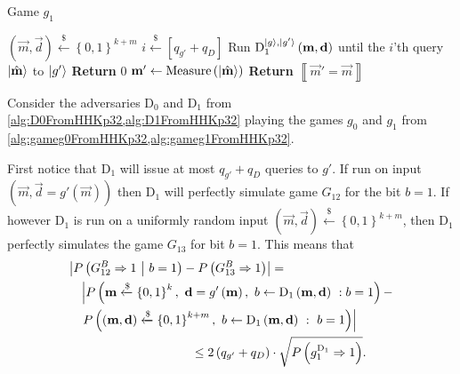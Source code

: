 \begin{center}
\begin{minipage}[ht!]{0.7\textwidth}
	\begin{algorithm}[H]
		\centering
		\caption{Game $g_1$}
		\label{alg:gameg1FromHHKp32}
		\begin{algorithmic}
			\State $\left(\vec{m}, \vec{d}\right) \xleftarrow{\$} \left\{ 0,1 \right\}^{k + m}$
			\State $i \xleftarrow{\$} \left[ q_{g'} + q_D \right]$
			\State Run $\mathrm{D}_1^{\lvert g\rangle, \lvert g'\rangle}\left(\boldsymbol{\mathrm{m}}, \boldsymbol{\mathrm{d}}\right)$ until the $i$'th query $\lvert\hat{\boldsymbol{\mathrm{m}}}\rangle$ to $\lvert g'\rangle$
				\State \textbf{Return} $0$
			\Else
				\State $\boldsymbol{\mathrm{m}}' \leftarrow \mathrm{Measure}\left( \lvert\hat{\boldsymbol{\mathrm{m}}}\rangle \right)$
				\State \textbf{Return} $\left\llbracket \vec{m}' = \vec{m} \right\rrbracket$
			\EndIf
		\end{algorithmic}
	\end{algorithm}
\end{minipage}
\end{center}

Consider the adversaries $\mathrm{D}_0$ and $\mathrm{D}_1$ from \cref{alg:D0FromHHKp32,alg:D1FromHHKp32} playing the games $g_0$ and $g_1$ from \cref{alg:gameg0FromHHKp32,alg:gameg1FromHHKp32}.

First notice that $\mathrm{D}_1$ will issue at most $q_{g'} + q_D$ queries to $g'$. If run on input $\left(\vec{m}, \vec{d} = g'\left(\vec{m}\right)\right)$ then $\mathrm{D}_1$ will perfectly simulate game $G_{12}$ for the bit $b = 1$. If however $\mathrm{D}_1$ is run on a uniformly random input $\left(\vec{m}, \vec{d}\right) \xleftarrow{\$} \left\{ 0,1 \right\}^{k + m}$, then $\mathrm{D}_1$ perfectly simulates the game $G_{13}$ for bit $b = 1$. This means that
\begin{equation*}
\begin{aligned}
	&\left\vert P\left( G_{12}^B \Rightarrow 1 \ \middle\vert \ b = 1 \right) - P\left( G_{13}^B \Rightarrow 1 \right) \right\vert =\\
		& \quad \left\vert P\left( \boldsymbol{\mathrm{m}} \xleftarrow{\$} \left\{ 0,1 \right\}^k,\ \boldsymbol{\mathrm{d}} = g'\left(\boldsymbol{\mathrm{m}}\right),\ b \leftarrow \mathrm{D}_1\left(\boldsymbol{\mathrm{m}}, \boldsymbol{\mathrm{d}}\right) \ : b = 1 \right) - \right. \\
		&\left. \quad P\left( \left(\boldsymbol{\mathrm{m}}, \boldsymbol{\mathrm{d}}\right) \xleftarrow{\$} \left\{ 0,1 \right\}^{k + m},\ b \leftarrow \mathrm{D}_1\left(\boldsymbol{\mathrm{m}}, \boldsymbol{\mathrm{d}}\right) \ : \ b = 1 \right) \right\vert\\
		& \qquad\qquad\qquad\qquad\qquad\leq 2 \left(q_{g'} + q_D\right) \cdot \sqrt{P\left( g_1^{\mathrm{D}_1} \Rightarrow 1 \right)}.
\end{aligned}
\end{equation*}

